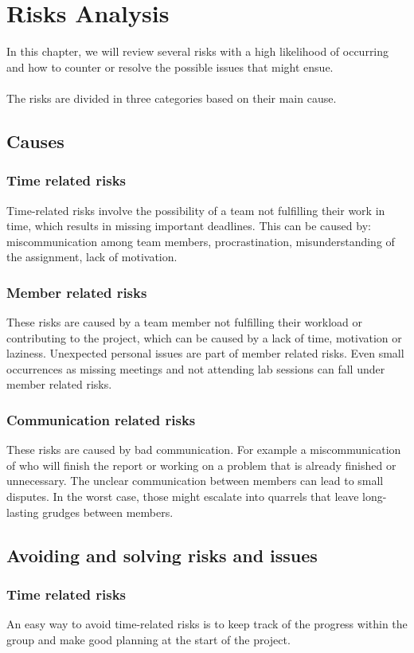 \chapter{Risks Analysis }
In this chapter, we will review several risks with a high likelihood of occurring and how to counter or resolve the possible issues that might ensue.\\
\\
The risks are divided in three categories based on their main cause.
\section{Causes}
\subsection{Time related risks}
Time-related risks involve the possibility of a team not fulfilling their work in time, which results in missing important deadlines. This can be caused by: miscommunication among team members, procrastination, misunderstanding of the assignment, lack of motivation.

\subsection{Member related risks}
These risks are caused by a team member not fulfilling their workload or contributing to the project, which can be caused by a lack of time, motivation or laziness. Unexpected personal issues are part of member related risks. Even small occurrences as missing meetings and not attending lab sessions can fall under member related risks.

\subsection{Communication related risks}
These risks are caused by bad communication. For example a miscommunication of who will finish the report or working on a problem that is already finished or unnecessary. The unclear communication between members can lead to small disputes. In the worst case, those might escalate into quarrels that leave long-lasting grudges between members. 

\section{Avoiding and solving risks and issues}
\subsection{Time related risks}
An easy way to avoid time-related risks is to keep track of the progress within the group and make good planning at the start of the project. 

